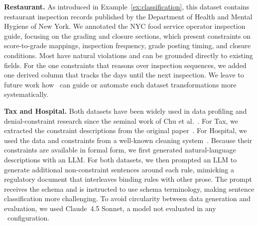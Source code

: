 \smallskip\noindent\textbf{Restaurant.}
As introduced in Example~\ref{ex:classification}, this dataset contains
restaurant inspection records published by the Department of Health and Mental
Hygiene of New York. We annotated the NYC food service operator
inspection guide, focusing on the grading and closure sections, which present
constraints on score-to-grade mappings, inspection frequency, grade posting
timing, and closure conditions. Most have natural violations and can be
grounded directly to existing fields. For the one constraints that reasons over
inspection sequences, we added one derived column that tracks the days until the next inspection. We leave to future work how \system\ can guide or automate such dataset
transformations more systematically.


\smallskip\noindent\textbf{Tax and Hospital.}
Both datasets have been widely used in data profiling and denial-constraint
research since the seminal work of Chu et al.~\cite{chu2013discovering}. For
Tax, we extracted the constraint descriptions from the original
paper~\cite{chu2013discovering}. For Hospital, we used the data and constraints from
a well-known cleaning system~\cite{holoclean}. Because their constraints are available in
formal form, we first generated natural-language descriptions with an LLM. For
both datasets, we then prompted an LLM to generate additional non-constraint
sentences around each rule, mimicking a regulatory document that interleaves
binding rules with other prose. The prompt receives the schema and is
instructed to use schema terminology, making sentence classification more
challenging. To avoid circularity between data generation and evaluation, we used Claude~4.5 Sonnet, a model not
evaluated in any \system\ configuration.



